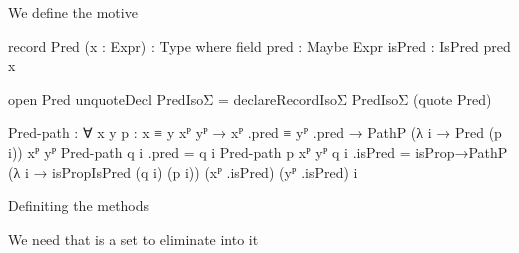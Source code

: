 We define the motive
\begin{code}
  record Pred (x : Expr) : Type where
    field
      pred    : Maybe Expr
      isPred  : IsPred pred x
\end{code}
\begin{code}[hide]
  open Pred
  unquoteDecl PredIsoΣ = declareRecordIsoΣ PredIsoΣ (quote Pred)

  Pred-path :
    ∀ {x y} {p : x ≡ y} {xᴾ yᴾ} →
    xᴾ .pred ≡ yᴾ .pred → PathP (λ i → Pred (p i)) xᴾ yᴾ
  Pred-path q i .pred = q i
  Pred-path {p} {xᴾ} {yᴾ} q i .isPred =
    isProp→PathP (λ i → isPropIsPred (q i) (p i)) (xᴾ .isPred) (yᴾ .isPred) i
\end{code}
Definiting the methods

We need that  is a set to eliminate into it

